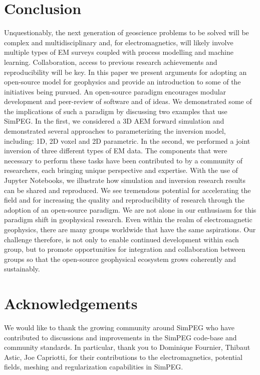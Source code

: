\documentclass[paper]{geophysics}
\begin{document}
\section{Conclusion}

Unquestionably, the next generation of geoscience problems to be solved will be complex and multidisciplinary and, for electromagnetics, will likely involve multiple types of EM surveys coupled with process modelling and machine learning. Collaboration, access to previous research achievements and reproducibility will be key. In this paper we present arguments for adopting an open-source model for geophysics and provide an introduction to some of the initiatives being pursued. An open-source paradigm encourages modular development and peer-review of software and of ideas. We demonstrated some of the implications of such a paradigm by discussing two examples that use SimPEG. In the first, we considered a 3D AEM forward simulation and demonstrated several approaches to parameterizing the inversion model, including: 1D, 2D voxel and 2D parametric. In the second, we performed a joint inversion of three different types of EM data. The components that were necessary to perform these tasks have been contributed to by a community of researchers, each bringing unique perspective and expertise. With the use of Jupyter Notebooks, we illustrate how simulation and inversion research results can be shared and reproduced. We see tremendous potential for accelerating the field and for increasing the quality and reproducibility of research through the adoption of an open-source paradigm. We are not alone in our enthusiasm for this paradigm shift in geophysical research. Even within the realm of electromagnetic geophysics, there are many groups worldwide that have the same aspirations. Our challenge therefore, is not only to enable continued development within each group, but to promote opportunities for integration and collaboration between groups so that the open-source geophysical ecosystem grows coherently and sustainably.


\section{Acknowledgements}
We would like to thank the growing community around SimPEG who have contributed to discussions and improvements in the SimPEG code-base and community standards. In particular, thank you to Dominique Fournier, Thibaut Astic, Joe Capriotti, for their contributions to the electromagnetics, potential fields, meshing and regularization capabilities in SimPEG.





\end{document}
